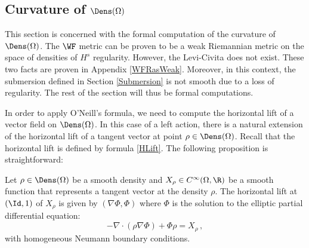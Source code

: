 \subsection{Curvature of $\Dens(\Omega)$}
This section is concerned with the formal computation of the curvature of $\Dens(\Omega)$.
The $\WF$ metric can be proven to be a weak Riemannian metric on the space of densities of $H^s$ regularity. However, the Levi-Civita does not exist. These two facts are proven in Appendix \ref{WFRasWeak}.
Moreover, in this context, the submersion defined in Section \ref{Submersion} is not smooth due to a loss of regularity. The rest of the section will thus be formal computations.

In order to apply O'Neill's formula, we need to compute the horizontal lift 
of a vector field on  $\Dens(\Omega)$. In this case of a left action, there is a natural extension of the horizontal lift of a tangent vector at point $\rho \in \Dens(\Omega)$. Recall that the horizontal lift is defined by formula \eqref{HLift}. 
The following proposition is straightforward:
\begin{proposition}\label{HorizontalLiftFormulation}
Let $\rho \in \Dens(\Omega)$ be a smooth density and $X_\rho \in C^\infty(\Omega,\R)$ %
be a smooth function that represents a tangent vector at the density $\rho$.
The horizontal lift at $(\Id, 1)$ of $X_\rho$ is given by $(\nabla \Phi,\Phi)$ where $\Phi$ is the solution to the elliptic partial differential equation:
\begin{equation}\label{EllipticEquation}
-\nabla \cdot (\rho \nabla \Phi)  + \Phi \rho = X_\rho\,,
\end{equation}
with homogeneous Neumann boundary conditions.
\end{proposition}


